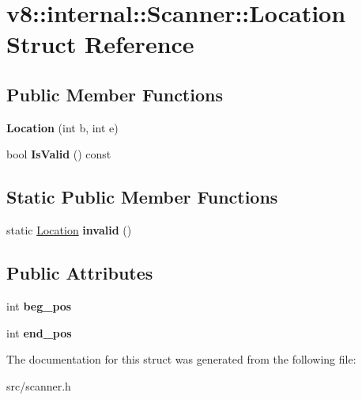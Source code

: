 \hypertarget{structv8_1_1internal_1_1_scanner_1_1_location}{}\section{v8\+:\+:internal\+:\+:Scanner\+:\+:Location Struct Reference}
\label{structv8_1_1internal_1_1_scanner_1_1_location}
\subsection*{Public Member Functions}
\begin{DoxyCompactItemize}
\item 
\hypertarget{structv8_1_1internal_1_1_scanner_1_1_location_af089d35d57d66e0ff0e4558ce445494d}{}{\bfseries Location} (int b, int e)\label{structv8_1_1internal_1_1_scanner_1_1_location_af089d35d57d66e0ff0e4558ce445494d}

\item 
\hypertarget{structv8_1_1internal_1_1_scanner_1_1_location_afd64e4ffc011749e6799302045df3428}{}bool {\bfseries Is\+Valid} () const \label{structv8_1_1internal_1_1_scanner_1_1_location_afd64e4ffc011749e6799302045df3428}

\end{DoxyCompactItemize}
\subsection*{Static Public Member Functions}
\begin{DoxyCompactItemize}
\item 
\hypertarget{structv8_1_1internal_1_1_scanner_1_1_location_aca07bb7c787fa37e598ec7a18d947ac5}{}static \hyperlink{structv8_1_1internal_1_1_scanner_1_1_location}{Location} {\bfseries invalid} ()\label{structv8_1_1internal_1_1_scanner_1_1_location_aca07bb7c787fa37e598ec7a18d947ac5}

\end{DoxyCompactItemize}
\subsection*{Public Attributes}
\begin{DoxyCompactItemize}
\item 
\hypertarget{structv8_1_1internal_1_1_scanner_1_1_location_a04a6e70dca2ccfa5072520c84de16eab}{}int {\bfseries beg\+\_\+pos}\label{structv8_1_1internal_1_1_scanner_1_1_location_a04a6e70dca2ccfa5072520c84de16eab}

\item 
\hypertarget{structv8_1_1internal_1_1_scanner_1_1_location_a0beaf28ea5c585f2560af74bb2c53ab4}{}int {\bfseries end\+\_\+pos}\label{structv8_1_1internal_1_1_scanner_1_1_location_a0beaf28ea5c585f2560af74bb2c53ab4}

\end{DoxyCompactItemize}


The documentation for this struct was generated from the following file\+:\begin{DoxyCompactItemize}
\item 
src/scanner.\+h\end{DoxyCompactItemize}
